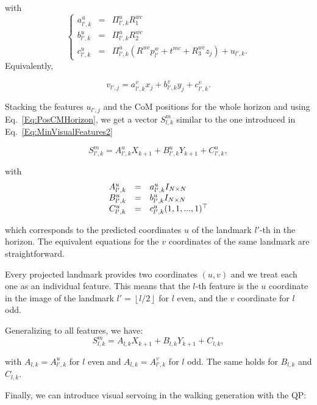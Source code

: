with 
$$
\left\{
\begin{array}{ccl}
a^u_{l',k} & = & \Pi^u_{l',k} R^{wc}_1\\
b^u_{l',k} & = & \Pi^u_{l',k} R^{wc}_2\\
c^u_{l',k} & = & \Pi^u_{l',k} (R^{wc} p^{w}_{l'} + t^{mc} + R^{wc}_3 z_j) + u_{l',k}.
\end{array}
\right.
$$
Equivalently,

\begin{equation}
\label{Eq:FeaturesVReduced}
  v_{l',j} = a^v_{l',k} x_j + b^v_{l',k} y_j + c^v_{l',k}.
\end{equation}

Stacking the features $u_{l',j}$ and the CoM positions for the whole horizon and using Eq.~\ref{Eq:PosCMHorizon}, we get a vector $S^m_{l,k}$ similar to the one introduced in Eq.~\ref{Eq:MinVisualFeatures2} 

\begin{equation*}
S^m_{l',k} = A^u_{l',k} X_{k+1} + B^u_{l',k} Y_{k+1} + C_{l',k}^u,
\end{equation*}

with 
$$
\begin{array}{ccl}
A^u_{l',k} &=& a^u_{l',k} I_{N\times N}\\
B^u_{l',k} &=& b^u_{l',k} I_{N\times N}\\
C_{l',k}^u &=& c^u_{l',k} (1,1,...,1)^{\top}
\end{array}
$$

 which corresponds to the predicted coordinates $u$ of the landmark $l'$-th in the horizon.
The equivalent equations for the $v$ coordinates of the same landmark are straightforward.

Every projected landmark provides two coordinates $(u,v)$ and we treat each one as an individual feature. This means that the $l$-th feature is the $u$ coordinate in the image of the landmark $l' = \left \lfloor l/2 \right \rfloor$ for $l$ even, and the $v$ coordinate for $l$ odd.

Generalizing to all features, we have:
\begin{equation}
\label{Eq:FeaturesStacked}
 S^m_{l,k} = A_{l,k} X_{k+1} + B_{l,k} Y_{k+1} + C_{l,k},
\end{equation}

with $A_{l,k} = A^u_{l',k}$ for $l$ even and $A_{l,k} = A^v_{l',k}$ for $l$ odd. The same holds for $B_{l,k}$ and $C_{l,k}$.

Finally, we can introduce visual servoing in the walking generation with the QP:

